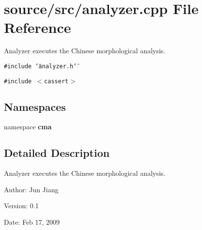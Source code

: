 \section{source/src/analyzer.cpp File Reference}
\label{analyzer_8cpp}
Analyzer executes the Chinese morphological analysis. 

{\tt \#include \char`\"{}analyzer.h\char`\"{}}\par
{\tt \#include $<$cassert$>$}\par
\subsection*{Namespaces}
\begin{CompactItemize}
\item 
namespace \textbf{cma}
\end{CompactItemize}


\subsection{Detailed Description}
Analyzer executes the Chinese morphological analysis. 

\begin{Desc}
\item[Author:]Jun Jiang \end{Desc}
\begin{Desc}
\item[Version:]0.1 \end{Desc}
\begin{Desc}
\item[Date:]Feb 17, 2009 \end{Desc}
